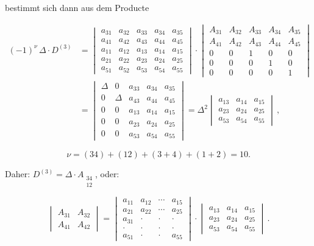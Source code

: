 \documentclass[11pt]{article}
\let\Delta\varDelta
\begin{document}
bestimmt sich dann aus dem Producte

\begin{align*}
(-1)^{\nu}\, \Delta \cdot D^{(3)} &=
\begin{vmatrix}
a_{31} & a_{32} & a_{33} & a_{34} & a_{35} \\
a_{41} & a_{42} & a_{43} & a_{44} & a_{45} \\
a_{11} & a_{12} & a_{13} & a_{14} & a_{15} \\
a_{21} & a_{22} & a_{23} & a_{24} & a_{25} \\
a_{51} & a_{52} & a_{53} & a_{54} & a_{55}
\end{vmatrix}
\cdot
\begin{vmatrix}
A_{31} & A_{32} & A_{33} & A_{34} & A_{35} \\
A_{41} & A_{42} & A_{43} & A_{44} & A_{45} \\
0 & 0 & 1 & 0 & 0 \\
0 & 0 & 0 & 1 & 0 \\
0 & 0 & 0 & 0 & 1
\end{vmatrix} \\
&=
\begin{vmatrix}
\Delta & 0 & a_{33} & a_{34} & a_{35} \\
0 & \Delta & a_{43} & a_{44} & a_{45} \\
0 & 0 & a_{13} & a_{14} & a_{15} \\
0 & 0 & a_{23} & a_{24} & a_{25} \\
0 & 0 & a_{53} & a_{54} & a_{55}
\end{vmatrix}
=
\Delta^2
\begin{vmatrix}
a_{13} & a_{14} & a_{15} \\
a_{23} & a_{24} & a_{25} \\
a_{53} & a_{54} & a_{55}
\end{vmatrix}\, ,
\end{align*}

\[
\nu = (34) + (12) + (3+4) + (1+2) = 10. %
\]

Daher: $D^{(3)} = \Delta \cdot A_{\substack{34\\12}}$, oder:

\[
\begin{vmatrix}
A_{31} & A_{32} \\
A_{41} & A_{42}
\end{vmatrix}
=
\begin{vmatrix}
a_{11} & a_{12} & \cdots & a_{15} \\
a_{21} & a_{22} & \cdots & a_{25} \\
a_{31} & \cdot & \cdot & \cdot \\
\cdot & \cdot & \cdot & \cdot \\
a_{51} & \cdot & \cdot & a_{55}
\end{vmatrix}
\cdot
\begin{vmatrix}
a_{13} & a_{14} & a_{15} \\
a_{23} & a_{24} & a_{25} \\
a_{53} & a_{54} & a_{55}
\end{vmatrix}\, .
\]
\end{document}
